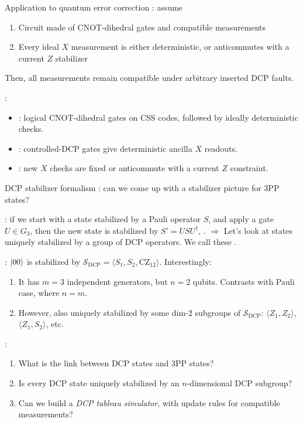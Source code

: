 \documentclass[aspectratio=169,11pt,t]{beamer}
\begin{document}
\begin{frame}{Application to quantum error correction}
  : assume
  \begin{enumerate}
    \item Circuit made of CNOT-dihedral gates and compatible measurements
    \item Every ideal $X$ measurement is either deterministic, or anticommutes with a current $Z$ stabilizer
  \end{enumerate}
  Then, all measurements remain compatible under arbitrary inserted DCP faults.

  \pause
  :
  \begin{itemize}
    \item {}: logical
      CNOT-dihedral gates on CSS codes, followed by ideally deterministic checks.
    \item {}: controlled-DCP gates give deterministic ancilla $X$ readouts.
    \item {}: new $X$ checks are
      fixed or anticommute with a current $Z$ constraint.
  \end{itemize}
\end{frame}


\begin{frame}{DCP stabilizer formalism}
  : can we come up with a stabilizer picture for 3PP states?

  \pause
  : if we start with a state stabilized by a Pauli operator $S$, and apply a gate $U \in G_3$, then the new state is stabilized by $S'=U S U^\dag$, .
  \newline
  $\Rightarrow$ Let's look at states uniquely stabilized by a group of DCP operators. We call these .

  \pause
  : $\ket{00}$ is stabilized by
  $\mathcal{S}_{\text{DCP}} = \langle S_1, S_2, \text{CZ}_{12} \rangle$. Interestingly:
  \begin{enumerate}
    \item It has $m=3$ independent generators, but $n=2$ qubits. Contrasts with Pauli case, where $n=m$.
    \item However, also uniquely stabilized by some dim-$2$ subgroups of $\mathcal{S}_{\text{DCP}}$: $\langle Z_1, Z_2 \rangle$, $\langle Z_1, S_2 \rangle$, etc.
  \end{enumerate}

  :
  \begin{enumerate}
    \item What is the link between DCP states and 3PP states?
    \item Is every DCP state uniquely stabilized by an $n$-dimensional DCP subgroup?
    \item Can we build a \textit{DCP tableau simulator}, with update rules for compatible measurements?
  \end{enumerate}
\end{frame}
\end{document}
